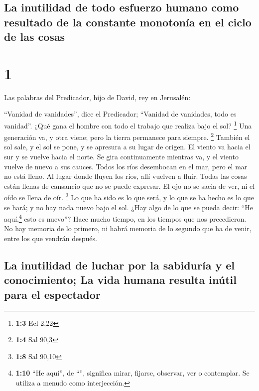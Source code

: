 \hypertarget{la-inutilidad-de-todo-esfuerzo-humano-como-resultado-de-la-constante-monotonuxeda-en-el-ciclo-de-las-cosas}{%
\subsection{La inutilidad de todo esfuerzo humano como resultado de la
constante monotonía en el ciclo de las
cosas}\label{la-inutilidad-de-todo-esfuerzo-humano-como-resultado-de-la-constante-monotonuxeda-en-el-ciclo-de-las-cosas}}

\hypertarget{section}{%
\section{1}\label{section}}

 Las palabras del Predicador, hijo de David, rey en
Jerusalén:

 ``Vanidad de vanidades'', dice el Predicador; ``Vanidad
de vanidades, todo es vanidad''.  ¿Qué gana el hombre con
todo el trabajo que realiza bajo el sol? \footnote{\textbf{1:3} Ecl 2,22}
 Una generación va, y otra viene; pero la tierra permanece
para siempre. \footnote{\textbf{1:4} Sal 90,3}  También el
sol sale, y el sol se pone, y se apresura a su lugar de origen.
 El viento va hacia el sur y se vuelve hacia el norte. Se
gira continuamente mientras va, y el viento vuelve de nuevo a sus
cauces.  Todos los ríos desembocan en el mar, pero el mar
no está lleno. Al lugar donde fluyen los ríos, allí vuelven a fluir.
 Todas las cosas están llenas de cansancio que no se puede
expresar. El ojo no se sacia de ver, ni el oído se llena de oír.
\footnote{\textbf{1:8} Sal 90,10}  Lo que ha sido es lo
que será, y lo que se ha hecho es lo que se hará; y no hay nada nuevo
bajo el sol.  ¿Hay algo de lo que se pueda decir: ``He
aquí,\footnote{\textbf{1:10} ``He aquí'', de ``'', significa
  mirar, fijarse, observar, ver o contemplar. Se utiliza a menudo como
  interjección.} esto es nuevo''? Hace mucho tiempo, en los tiempos que
nos precedieron.  No hay memoria de lo primero, ni habrá
memoria de lo segundo que ha de venir, entre los que vendrán después.

\hypertarget{la-inutilidad-de-luchar-por-la-sabiduruxeda-y-el-conocimiento-la-vida-humana-resulta-inuxfatil-para-el-espectador}{%
\subsection{La inutilidad de luchar por la sabiduría y el conocimiento;
La vida humana resulta inútil para el
espectador}\label{la-inutilidad-de-luchar-por-la-sabiduruxeda-y-el-conocimiento-la-vida-humana-resulta-inuxfatil-para-el-espectador}}

